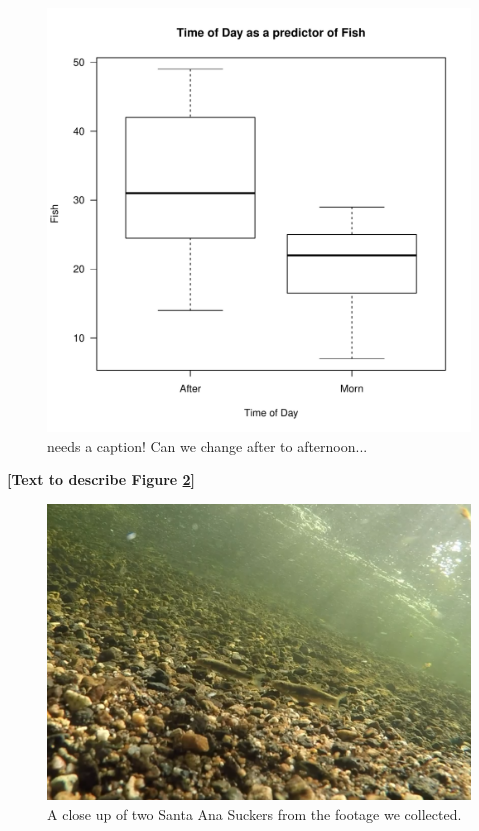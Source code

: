 \documentclass{article}\usepackage[]{graphicx}\usepackage[]{color}
\makeatletter
\def\maxwidth{ %
  \ifdim\Gin@nat@width>\linewidth
    \linewidth
  \else
    \Gin@nat@width
  \fi
}
\newenvironment{knitrout}{}{} %
\makeatother
\begin{document}
\begin{figure}[!ht]
\begin{knitrout}
\color{fgcolor}
\includegraphics[width=\maxwidth]{figure/unnamed-chunk-7-1} 

\end{knitrout}
\caption{needs a caption! Can we change after to afternoon...}
\label{fig:fishsection}
\end{figure}


\textbf{[Text to describe Figure \ref{fig:reallygoodcrop}]}

\begin{figure}
\includegraphics[scale=.4]{Videography_figures/reallygoodcrop}
\caption{A close up of two Santa Ana Suckers from the footage we collected.}
\label{fig:reallygoodcrop}
\end{figure}
\end{document}
